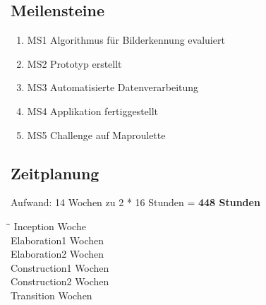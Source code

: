 \subsection{Meilensteine}
\begin{enumerate}
	\item MS1 Algorithmus für Bilderkennung evaluiert
	\item MS2 Prototyp erstellt
	\item MS3 Automatisierte Datenverarbeitung
	\item MS4 Applikation fertiggestellt
	\item MS5 Challenge auf Maproulette
\end{enumerate}

\subsection{Zeitplanung}
Aufwand: 14 Wochen zu 2 * 16 Stunden = \textbf{448 Stunden}
\begin{tabbing}[H]
    \hspace*{6cm}\=\hspace*{6cm}\= \kill
    Inception  Woche \\
	Elaboration1  Wochen \\
	Elaboration2  Wochen \\
	Construction1  Wochen \\
	Construction2  Wochen \\
	Transition  Wochen \\
\end{tabbing}

